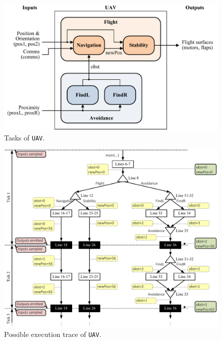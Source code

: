 \begin{figure}
	\centering

	\includegraphics[width=\columnwidth]{images/uav_tasks.pdf}

	\caption{Tasks of \texttt{UAV}.}
	\label{fig:forec_uav_tasks}
\end{figure}

\begin{figure}
	\centering

	\includegraphics[width=\columnwidth]{images/uav_timing1.pdf}

	\caption{Possible execution trace of \texttt{UAV}.}
	\label{fig:forec_uav_timing1}
\end{figure}

